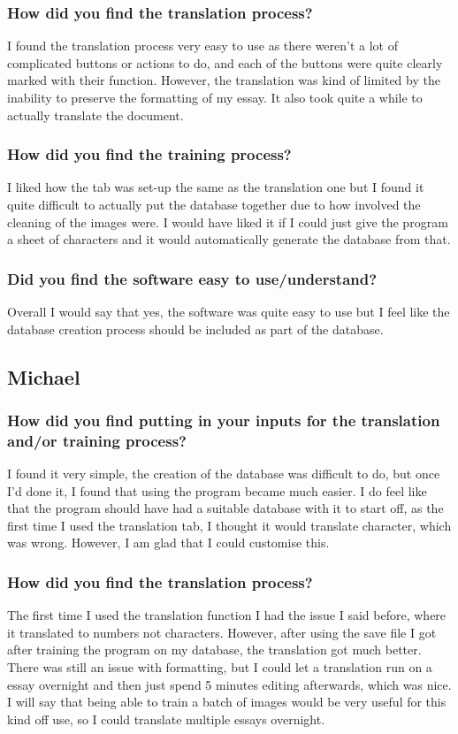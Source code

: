 \documentclass{report}
\begin{document}
\subsubsection{How did you find the translation process?}
I found the translation process very easy to use as there weren't a lot of complicated buttons or actions to do, and each of the buttons were quite clearly marked with their function. However, the translation was kind of limited by the inability to preserve the formatting of my essay. It also took quite a while to actually translate the document.
\subsubsection{How did you find the training process?}
I liked how the tab was set-up the same as the translation one but I found it quite difficult to actually put the database together due to how involved the cleaning of the images were. I would have liked it if I could just give the program a sheet of characters and it would automatically generate the database from that.
\subsubsection{Did you find the software easy to use/understand?}
Overall I would say that yes, the software was quite easy to use but I feel like the database creation process should be included as part of the database.
\subsection{Michael}
\subsubsection{How did you find putting in your inputs for the translation and/or training process?}
I found it very simple, the creation of the database was difficult to do, but once I'd done it, I found that using the program became much easier. I do feel like that the program should have had a suitable database with it to start off, as the first time I used the translation tab, I thought it would translate character, which was wrong. However, I am glad that I could customise this.
\subsubsection{How did you find the translation process?}
The first time I used the translation function I had the issue I said before, where it translated to numbers not characters. However, after using the save file I got after training the program on my database, the translation got much better. There was still an issue with formatting, but I could let a translation run on a essay overnight and then just spend 5 minutes editing afterwards, which was nice. I will say that being able to train a batch of images would be very useful for this kind off use, so I could translate multiple essays overnight.
\end{document}
